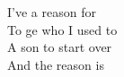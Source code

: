 I've  a reason for  \\
To ge who I used to  \\
A son to start over  \\
\songwordfb{} And the reason is  \\
